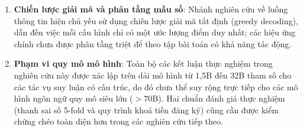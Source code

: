 \documentclass[12pt,a4paper]{article}
\begin{document}
\begin{enumerate}
      khoảng tin cậy tham số.
\item \textbf{Chiến lược giải mã và phân tầng mẫu số}: Nhánh nghiên cứu về luồng thông tin hiện chủ
      yếu sử dụng chiến lược giải mã tất định (greedy decoding), dẫn đến việc mỗi cấu hình chỉ có một
      ước lượng điểm duy nhất; các hiệu ứng chính chưa được phân tầng triệt để theo tập bài toán có
      khả năng tác động.
\item \textbf{Phạm vi quy mô mô hình}: Toàn bộ các kết luận thực nghiệm trong nghiên cứu này được xác
      lập trên dải mô hình từ 1,5B đến 32B tham số cho các tác vụ suy luận có cấu trúc, do đó chưa thể
      suy rộng trực tiếp cho các mô hình ngôn ngữ quy mô siêu lớn ($>70$B). Hai chuẩn đánh giá thực
      nghiệm (thanh sai số 5-fold và quy trình khoá tiền đăng ký) cũng cần được kiểm chứng chéo toàn
      diện hơn trong các nghiên cứu tiếp theo.
\end{enumerate}
\end{document}
